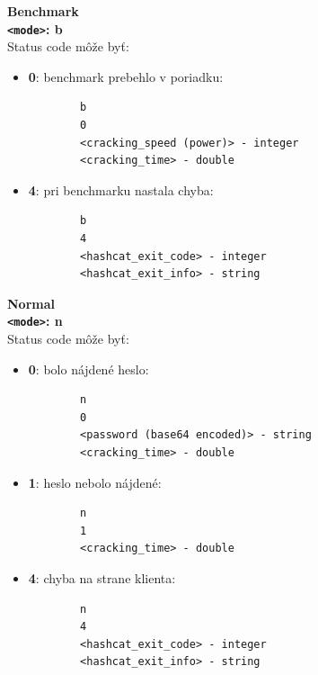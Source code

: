 \medskip
\textbf{Benchmark} \\
\textbf{\texttt{<mode>}: b} \\
Status code môže byť: \\
\begin{itemize}
	\item \textbf{0}: benchmark prebehlo v poriadku: \\
		\begin{verbatim}
		b
		0
		<cracking_speed (power)> - integer
		<cracking_time> - double
		\end{verbatim}


	\item \textbf{4}: pri benchmarku nastala chyba: \\
		\begin{verbatim}
		b
		4
		<hashcat_exit_code> - integer
		<hashcat_exit_info> - string
		\end{verbatim}
\end{itemize}

\medskip
\textbf{Normal} \\
\textbf{\texttt{<mode>}: n} \\
Status code môže byť: \\
\begin{itemize}
	\item \textbf{0}: bolo nájdené heslo: \\
		\begin{verbatim}
		n
		0
		<password (base64 encoded)> - string
		<cracking_time> - double
		\end{verbatim}
	\item \textbf{1}: heslo nebolo nájdené: \\
		\begin{verbatim}
		n
		1
		<cracking_time> - double
		\end{verbatim}
	\item \textbf{4}: chyba na strane klienta: \\
		\begin{verbatim}
		n
		4
		<hashcat_exit_code> - integer
		<hashcat_exit_info> - string
		\end{verbatim}
\end{itemize}

